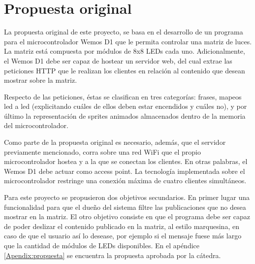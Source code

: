
\section{Propuesta original}
    
    La propuesta original de este proyecto, se basa en el desarrollo de un programa para el microcontrolador Wemos D1 que le permita controlar una matriz de luces. La matriz está compuesta por módulos de 8x8 LEDs cada uno. Adicionalmente, el Wemos D1 debe ser capaz de hostear un servidor web, del cual extrae las peticiones HTTP que le realizan los clientes en relación al contenido que desean mostrar sobre la matriz.
    
    Respecto de las peticiones, éstas se clasifican en tres categorías: frases, mapeos led a led (explicitando cuáles de ellos deben estar encendidos y cuáles no), y por último la representación de sprites animados almacenados dentro de la memoria del microcontrolador.
    
    Como parte de la propuesta original es necesario, además, que el servidor previamente mencionado, corra sobre una red WiFi que el propio microcontrolador hostea y a la que se conectan los clientes. En otras palabras, el Wemos D1 debe actuar como access point. La tecnología implementada sobre el microcontrolador restringe una conexión máxima de cuatro clientes simultáneos.
    
    Para este proyecto se propusieron dos objetivos secundarios. En primer lugar una funcionalidad para que el dueño del sistema filtre las publicaciones que no desea mostrar en la matriz. El otro objetivo consiste en que el programa debe ser capaz de poder deslizar el contenido publicado en la matriz, al estilo marquesina, en caso de que el usuario así lo desease, por ejemplo si el mensaje fuese más largo que la cantidad de módulos de LEDs disponibles. En el apéndice \ref{Apendix:propuesta} se encuentra la propuesta aprobada por la cátedra.
    
    
    
    
